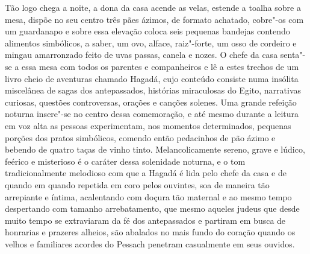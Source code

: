 Tão logo chega a noite, a dona da casa acende as velas, estende a toalha
sobre a mesa, dispõe no seu centro três pães ázimos, de formato
achatado, cobre"-os com um guardanapo e sobre essa elevação coloca
seis pequenas bandejas contendo alimentos simbólicos, a saber, um ovo,
alface, raiz"-forte, um osso de cordeiro e mingau amarronzado feito de
uvas passas, canela e nozes. O chefe da casa senta"-se a essa mesa com
todos os parentes e companheiros e lê a estes trechos de um livro cheio
de aventuras chamado Hagadá, cujo conteúdo consiste numa insólita
miscelânea de sagas dos antepassados, histórias miraculosas do Egito,
narrativas curiosas, questões controversas, orações e canções solenes.
Uma grande refeição noturna insere"-se no centro dessa comemoração, e
até mesmo durante a leitura em voz alta as pessoas experimentam, nos
momentos determinados, pequenas porções dos pratos simbólicos, comendo
então pedacinhos de pão ázimo e bebendo de quatro taças de vinho tinto.
Melancolicamente sereno, grave e lúdico, feérico e misterioso é o
caráter dessa solenidade noturna, e o tom tradicionalmente melodioso
com que a Hagadá é lida pelo chefe da casa e de quando em quando
repetida em coro pelos ouvintes, soa de maneira tão arrepiante e
íntima, acalentando com doçura tão maternal e ao mesmo tempo
despertando com tamanho arrebatamento, que mesmo aqueles judeus que
desde muito tempo se extraviaram da fé dos antepassados e partiram em
busca de honrarias e prazeres alheios, são abalados no mais fundo do
coração quando os velhos e familiares acordes do Pessach penetram
casualmente em seus ouvidos.


